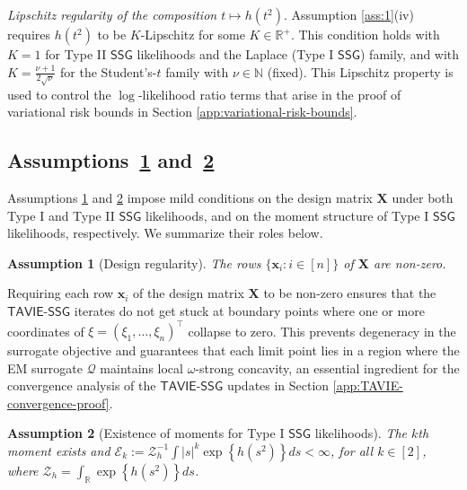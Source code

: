\documentclass[12pt]{article}
\newtheorem{assumption}{Assumption}
\numberwithin{equation}{section}
\newcommand{\ssg}{\mathsf{SSG}}
\newcommand{\tssg}{\mathsf{TAVIE}\text{-}\mathsf{SSG}}
\begin{document}
\noindent
\emph{Lipschitz regularity of the composition $t\mapsto h(t^2)$}. Assumption \ref{ass:1}(iv) requires $h(t^2)$ to be $K$-Lipschitz for some $K\in \mathbb{R}^{+}$. This condition holds with $K=1$ for Type II $\ssg$ likelihoods and the Laplace (Type I $\ssg$) family, and with $K=\tfrac{\nu+1}{2\sqrt{\nu}}$ for the Student's-$t$ family with $\nu\in \mathbb{N}$ (fixed). This Lipschitz property is used to control the $\log$-likelihood ratio terms that arise in the proof of variational risk bounds in Section \ref{app:variational-risk-bounds}.


\subsection{\texorpdfstring{Assumptions~\ref{ass:2} and~\ref{ass:3}}{Assumptions 2 and 3}}

Assumptions \ref{ass:2} and \ref{ass:3} impose mild conditions on the design matrix $\mathbf{X}$ under both Type I and Type II $\ssg$ likelihoods, and on the moment structure of Type I $\ssg$ likelihoods, respectively. We summarize their roles below.

\begin{assumption}[Design regularity]
\label{ass:2}
The rows $\{\mathbf{x}_i: i \in [n]\}$ of $\mathbf{X}$ are non-zero.
\end{assumption}

Requiring each row $\mathbf{x}_i$ of the design matrix $\mathbf{X}$ to be non-zero ensures that the $\tssg$ iterates do not get stuck at boundary points where one or more coordinates of $\xi = (\xi_1, \ldots, \xi_n)^{\top}$ collapse to zero. This prevents degeneracy in the surrogate objective and guarantees that each limit point lies in a region where the EM surrogate $\mathcal{Q}$ maintains local $\omega$-strong concavity, an essential ingredient for the convergence analysis of the $\tssg$ updates in Section \ref{app:TAVIE-convergence-proof}.

\begin{assumption}[Existence of moments for Type I $\mathsf{SSG}$ likelihoods]
\label{ass:3}
The $k$th moment exists and
$\mathscr{E}_k := \mathcal{Z}_h^{-1}\int |s|^k\exp\left\{h(s^2)\right\}ds  < \infty$, for all $k\in [2]$, where $\mathcal{Z}_h = \int_{\mathbb{R}} \exp\left\{h(s^2)\right\}ds$.
\end{assumption}
\end{document}
